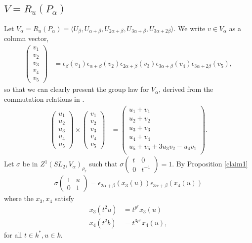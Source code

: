 	\subsection{$V = R_u(P_\alpha)$}
	\label{g2:alpha}
	Let $V_\alpha = R_u(P_\alpha) = \langle U_\beta, U_{\alpha+\beta}, U_{2\alpha+\beta}, U_{3\alpha+\beta}, U_{3\alpha+2\beta}\rangle$.
	We write $v \in V_\alpha$ as a column vector,
	\begin{align*}
	\left(\begin{matrix}
			v_1\\
			v_2\\
			v_3\\
			v_4\\
			v_5
			\end{matrix}\right) &=
\epsilon_{\beta}(v_1)
\epsilon_{\alpha+\beta}(v_2)
\epsilon_{2\alpha+\beta}(v_3)
\epsilon_{3\alpha+\beta}(v_4)
	\epsilon_{3\alpha+2\beta}(v_5),
	\end{align*}
	so that we can clearly present the group law for $V_\alpha$, derived from the commutation relations in \cite[\S 33.5]{humphreys1975linear}.
	\begin{align*}
	\left(\begin{matrix}
			u_1\\
			u_2\\
			u_3\\
			u_4\\
			u_5
			\end{matrix}\right)\times
	\left(\begin{matrix}
			v_1\\
			v_2\\
			v_3\\
			v_4\\
			v_5
			\end{matrix}\right)
	&= \left(\begin{matrix}
			u_1 + v_1\\
			u_2 + v_2\\
			u_3 + v_3\\
			u_4 + v_4\\
			u_5 + v_5 + 3u_3v_2 - u_4v_1\\
			\end{matrix}\right).
	\end{align*}
	Let $\sigma$ be in $Z^1(SL_2, V_\alpha)_{\rho_r}$ such that $\sigma\left(\begin{matrix}t & 0\\0 & t^{-1}\end{matrix}\right) = 1$.
	By Proposition \ref{claim1}
	\begin{align*}
	\sigma\left(\begin{matrix} 1 & u \\ 0 & 1 \end{matrix}\right) =
\epsilon_{2\alpha+\beta}(x_3(u))
\epsilon_{3\alpha+\beta}(x_4(u))
	\end{align*}
	where the $x_3, x_4$ satisfy
	\begin{align}
	x_3(t^2u) &= t^{p^r}x_3(u)\label{eqn:g2x3}\\
							 x_4(t^2b) &= t^{3p^r}x_4(u)\label{eqn:g2x4},
	\end{align}
	for all $t\in k^*, u\in k$.

